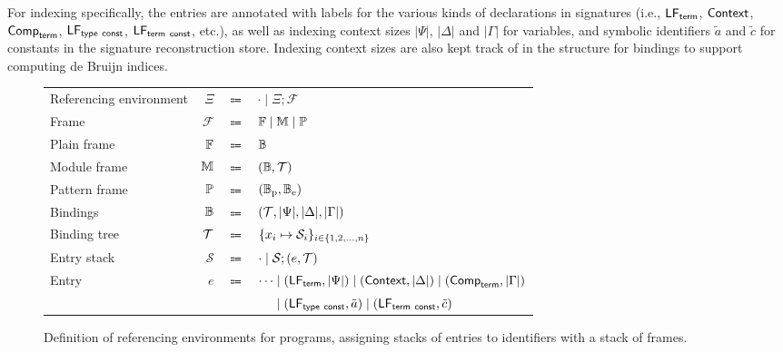 For indexing specifically, the entries are annotated with labels for the various kinds of declarations in \Beluga signatures (i.e., $\mathsf{LF}_{\mathsf{term}}$, $\mathsf{Context}$, $\mathsf{Comp}_{\mathsf{term}}$, $\mathsf{LF}_{\mathsf{type\ const}}$, $\mathsf{LF}_{\mathsf{term\ const}}$, etc.), as well as indexing context sizes $|\Psi|$, $|\Delta|$ and $|\Gamma|$ for variables, and symbolic identifiers $\tilde a$ and $\tilde c$ for constants in the signature reconstruction store.
Indexing context sizes are also kept track of in the structure for bindings to support computing de Bruijn indices.

\begin{figure}
\centering
{\footnotesize
\begin{tabular}{lrcl}
Referencing environment & $\Xi$ & $\Coloneqq$ & $ \cdot \mid \Xi; \mathcal{F} $\\
Frame & $ \mathcal{F} $ & $ \Coloneqq $ & $ \mathbb{F} \mid \mathbb{M} \mid \mathbb{P} $\\
Plain frame & $ \mathbb{F} $ & $ \Coloneqq $ & $ \mathbb{B} $\\
Module frame & $ \mathbb{M} $ & $ \Coloneqq $ & $ (\mathbb{B}, \mathcal{T}) $\\
Pattern frame & $ \mathbb{P} $ & $ \Coloneqq $ & $ (\mathbb{B}_{\text{p}}, \mathbb{B}_{\text{e}}) $\\
Bindings & $ \mathbb{B} $ & $ \Coloneqq $ & $ (\mathcal{T}, |\Psi|, |\Delta|, |\Gamma|) $\\
Binding tree & $ \mathcal{T} $ & $ \Coloneqq $ & $ \{x_i \mapsto \mathcal{S}_i\}_{i \in \{1, 2, \dots, n\}} $\\
Entry stack & $ \mathcal{S} $ & $ \Coloneqq $ & $ \cdot \mid \mathcal{S}; (e, \mathcal{T}) $\\
Entry & $ e $ & $ \Coloneqq $ & $ \cdots \mid (\mathsf{LF}_{\mathsf{term}}, |\Psi|) \mid (\mathsf{Context}, |\Delta|) \mid (\mathsf{Comp}_{\mathsf{term}}, |\Gamma|) $\\
&&& $ \phantom{\cdots} \mid (\mathsf{LF}_{\mathsf{type\ const}}, \tilde a) \mid (\mathsf{LF}_{\mathsf{term\ const}}, \tilde c) $
\end{tabular}
}
\caption[Definition of referencing environments for \Beluga programs]{%
Definition of referencing environments for \Beluga programs, assigning stacks of entries to identifiers with a stack of frames.
}
\label{figure:referencing-environment-definition}
\end{figure}

